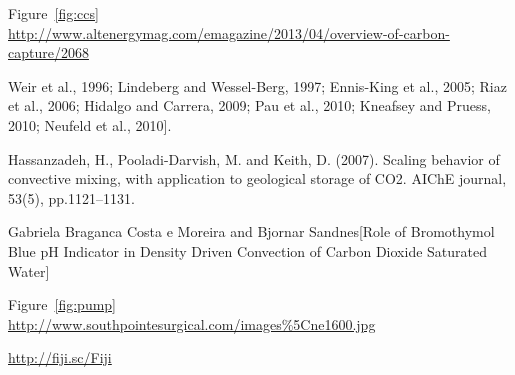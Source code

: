 \documentclass[twoside]{article}
\begin{document}
\newpage
\begin{thebibliography}{99} %

Figure~\ref{fig:ccs}\\
\url{http://www.altenergymag.com/emagazine/2013/04/overview-of-carbon-capture/2068}

Weir et al.,
1996; Lindeberg and Wessel-Berg, 1997; Ennis-King et al.,
2005; Riaz et al., 2006; Hidalgo and Carrera, 2009; Pau
et al., 2010; Kneafsey and Pruess, 2010; Neufeld et al.,
2010].

Hassanzadeh, H., Pooladi-Darvish, M. and Keith, D.
(2007). Scaling behavior of convective mixing, with
application to geological storage of CO2. AIChE journal,
53(5), pp.1121--1131.

Gabriela Braganca Costa e Moreira and Bjornar Sandnes[Role of Bromothymol Blue pH Indicator in Density
Driven Convection of Carbon Dioxide Saturated
Water]

Figure~\ref{fig:pump}\\
\url{http://www.southpointesurgical.com/images%5Cne1600.jpg}

\url{http://fiji.sc/Fiji}
\end{thebibliography}

\end{document}
